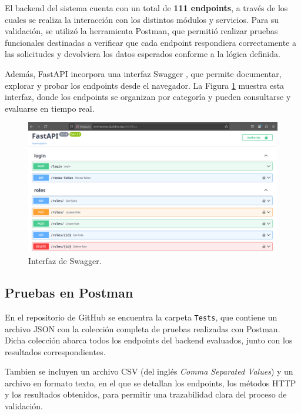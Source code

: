 El backend del sistema cuenta con un total de \textbf{111 endpoints}, a través
de los cuales se realiza la interacción con los distintos módulos y servicios.
Para su validación, se utilizó la herramienta Postman, que permitió realizar
pruebas funcionales destinadas a verificar que cada endpoint respondiera
correctamente a las solicitudes y devolviera los datos esperados conforme a la
lógica definida.

Además, FastAPI incorpora una interfaz Swagger \cite{SwaggerIO}, que permite
documentar, explorar y probar los endpoints desde el navegador. La Figura
\ref{fig:swagger} muestra esta interfaz, donde los endpoints se organizan por
categoría y pueden consultarse y evaluarse en tiempo real.

\begin{figure}[H]
    \centering
    \includegraphics[width=\textwidth]{Images/37_swagger.png}
    \caption[Interfaz de Swagger]{Interfaz de Swagger.}
    \label{fig:swagger}
\end{figure}

\subsection{Pruebas en Postman}

En el repositorio de GitHub \cite{EnviroSenseIoT} se encuentra la carpeta
\texttt{Tests}, que contiene un archivo JSON con la colección completa de
pruebas realizadas con Postman. Dicha colección abarca todos los endpoints del
backend evaluados, junto con los resultados correspondientes.

Tambien se incluyen un archivo CSV (del inglés \textit{Comma Separated Values})
y un archivo en formato texto, en el que se detallan los endpoints, los métodos
HTTP y los resultados obtenidos, para permitir una trazabilidad clara del
proceso de validación.

